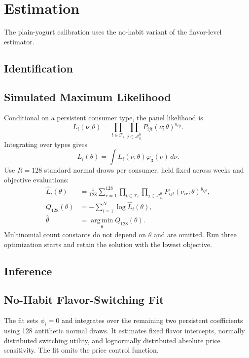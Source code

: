 \documentclass[12pt]{article}
\theoremstyle{definition}
\theoremstyle{remark}
\newcommand{\argmin}{\operatorname*{arg\,min}}
\begin{document}
\section{Estimation}
The plain-yogurt calibration uses the no-habit variant of the flavor-level estimator.
\label{sec:estimation}

\subsection{Identification}
\label{subsec:identification}

\subsection{Simulated Maximum Likelihood}
\label{subsec:estimation-procedure}
Conditional on a persistent consumer type, the panel likelihood is
\begin{equation}
 L_i(\nu;\theta)=\prod_{t\in\mathcal T_i}
 \prod_{j\in\mathcal A_{it}^0}P_{ijt}(\nu;\theta)^{y_{ijt}}.
\end{equation}
Integrating over types gives
\begin{equation}
 L_i(\theta)=\int L_i(\nu;\theta)\varphi_3(\nu)\,d\nu.
\end{equation}
Use $R=128$ standard normal draws per consumer, held fixed across weeks and
objective evaluations:
\begin{align}
 \widehat L_i(\theta)&=\frac{1}{128}\sum_{r=1}^{128}
 \prod_{t\in\mathcal T_i}\prod_{j\in\mathcal A_{it}^0}
 P_{ijt}(\nu_{ir};\theta)^{y_{ijt}},\\
 Q_{128}(\theta)&=-\sum_{i=1}^N\log\widehat L_i(\theta),
 \label{eq:estimation-objective}\\
 \widehat\theta&=\argmin_\theta Q_{128}(\theta).
\end{align}
Multinomial count constants do not depend on $\theta$ and are omitted.
Run three optimization starts and retain the solution with the lowest objective.


\subsection{Inference}


\subsection{No-Habit Flavor-Switching Fit}
The fit sets $\phi_i=0$ and integrates over the remaining two persistent
coefficients using 128 antithetic normal draws. It estimates fixed flavor
intercepts, normally distributed switching utility, and lognormally
distributed absolute price sensitivity. The fit omits the price control function.
\end{document}
